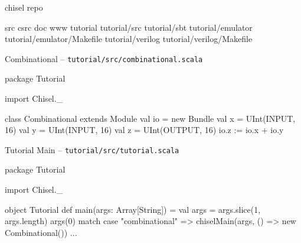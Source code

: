 \documentclass[xcolor=pdflatex,dvipsnames,table]{beamer}
\begin{document}
\begin{frame}[fragile]{chisel repo}
\begin{FramedSemiVerb}
src                        
csrc                       
doc                        
www                        
tutorial                   
tutorial/src               
tutorial/sbt               
tutorial/emulator          
tutorial/emulator/Makefile  
tutorial/verilog            
tutorial/verilog/Makefile   
\end{FramedSemiVerb}
\end{frame}

\begin{frame}[fragile]{Combinational -- \tt\small tutorial/src/combinational.scala}
\begin{scala}
package Tutorial

import Chisel._

class Combinational extends Module {
  val io = new Bundle {
    val x = UInt(INPUT, 16)
    val y = UInt(INPUT, 16)
    val z = UInt(OUTPUT, 16)
  }
  io.z := io.x + io.y
}
\end{scala}
\end{frame}

\begin{frame}[fragile]{Tutorial Main -- \tt tutorial/src/tutorial.scala}

\begin{scala}
package Tutorial

import Chisel._

object Tutorial {
  def main(args: Array[String]) = {
    val args = args.slice(1, args.length)
    args(0) match {
      case "combinational" => 
        chiselMain(args, () => new Combinational())
      ...
    }
  }
}
\end{scala}
\end{frame}
\end{document}
